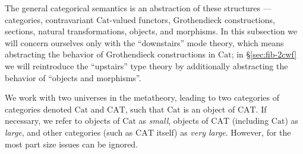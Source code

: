\documentclass[10pt]{article}
\theoremstyle{definition}
\newcommand\Cat{\mathrm{Cat}}
\newcommand\CAT{\mathrm{CAT}}
\begin{document}
The general categorical semantics is an abstraction of these structures --- categories, contravariant $\Cat$-valued functors, Grothendieck constructions, sections, natural transformations, objects, and morphisms.
In this subsection we will concern ourselves only with the ``downstairs'' mode theory, which means abstracting the behavior of Grothendieck constructions in $\Cat$; in \S\ref{sec:fib-2cwf} we will reintroduce the ``upstairs'' type theory by additionally abstracting the behavior of ``objects and morphisms''.

We work with two universes in the metatheory, leading to two categories of categories denoted $\Cat$ and $\CAT$, such that $\Cat$ is an object of $\CAT$.
If necessary, we refer to objects of $\Cat$ as \emph{small}, objects of $\CAT$ (including $\Cat$) as \emph{large}, and other categories (such as $\CAT$ itself) as \emph{very large}.
However, for the most part size issues can be ignored.
\end{document}
